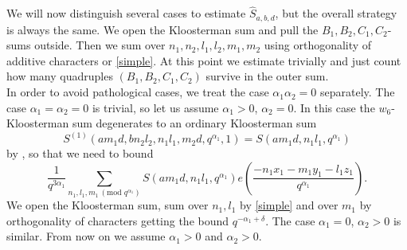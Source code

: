 \documentclass[11pt]{amsart}
\theoremstyle{plain}
\numberwithin{equation}{section}
\theoremstyle{definition}
\begin{document}
We will now distinguish several cases to estimate $\widehat{S}_{a, b, d}$, but the overall strategy  is always the same. We open the Kloosterman sum and pull the $B_1, B_2, C_1, C_2$-sums outside. Then we sum over $n_1, n_2, l_1, l_2, m_1, m_2$ using orthogonality of additive characters or \eqref{simple}. At this point we estimate trivially and just count how many quadruples $(B_1, B_2, C_1, C_2)$ survive in the outer sum.\\

In order to avoid pathological cases, we treat the case $\alpha_1\alpha_2 = 0$ separately. The case $\alpha_1 = \alpha_2 = 0$ is trivial, so let us assume $\alpha_1 > 0$, $\alpha_2 = 0$. In this case the  $w_6$-Kloosterman sum degenerates to an ordinary Kloosterman sum 
$$S^{(1)} (am_1d, bn_2l_2, n_1l_1, m_2d, q^{\alpha_1}, 1) = S(am_1d, n_1l_1, q^{\alpha_1})$$
by \cite[Property 4.9]{BFG}, so that we need to bound
$$\frac{1}{q^{3\alpha_1}} \sum_{n_1, l_1, m_1 \, (\text{mod } q^{\alpha_1})} S(am_1 d, n_1l_1, q^{\alpha_1}) e\left(\frac{-n_1x_1 - m_1y_1 - l_1z_1}{q^{\alpha_1}}\right).$$
We open the Kloosterman sum, sum over $n_1, l_1$ by \eqref{simple} and over $m_1$ by orthogonality of characters getting the bound $q^{-\alpha_1 + \delta}$. The case $\alpha_1 = 0$, $\alpha_2 > 0$ is similar. From now on we assume $\alpha_1 > 0$ and $\alpha_2 > 0$.\\
\end{document}
